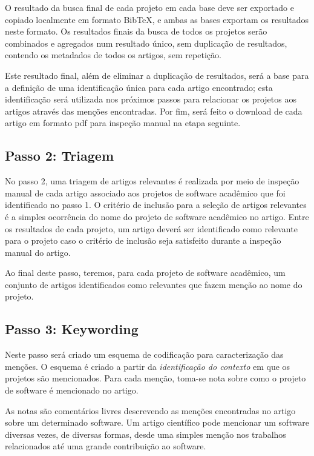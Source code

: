 O resultado da busca final de cada projeto em cada base deve ser exportado e
copiado localmente em formato BibTeX, e ambas as bases exportam os resultados
neste formato. Os resultados finais da busca de todos os projetos serão combinados
e agregados num resultado único, sem duplicação de resultados, contendo os
metadados de todos os artigos, sem repetição.

Este resultado final, além de eliminar a duplicação de resultados, será a base
para a definição de uma identificação única para cada artigo encontrado; esta
identificação será utilizada nos próximos passos para relacionar os projetos
aos artigos através das menções encontradas. Por fim, será feito o download de cada
artigo em formato pdf para inspeção manual na etapa seguinte.

\subsection{Passo 2: Triagem}

No passo 2, uma triagem de artigos relevantes é realizada por meio 
de inspeção manual de cada artigo associado aos projetos de software acadêmico
que foi identificado no passo 1.
O critério de inclusão para a seleção de artigos relevantes é a simples
ocorrência do nome do projeto de software acadêmico no artigo.
%
Entre os resultados de cada projeto,
um artigo deverá ser identificado como
relevante para o projeto caso o critério de inclusão seja satisfeito durante a
inspeção manual do artigo.

Ao final deste passo, teremos, para cada projeto
de software acadêmico, um conjunto de artigos identificados como relevantes que fazem
menção ao nome do projeto.

\subsection{Passo 3: Keywording}

Neste passo será criado um esquema de codificação para caracterização das
menções. O esquema é criado a partir da \textit{identificação do contexto} em que os
projetos são mencionados. Para cada menção, toma-se nota sobre como o projeto de
software é mencionado no artigo.

As notas são comentários livres descrevendo as menções encontradas no artigo
sobre um determinado software.
Um artigo científico pode mencionar um software
diversas vezes, de diversas formas, desde uma simples menção nos trabalhos
relacionados até uma grande contribuição ao software.

